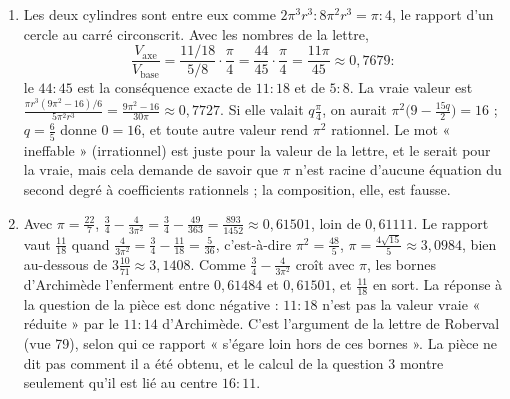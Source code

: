 \documentclass[11pt,a4paper]{article}
\begin{document}
\begin{solution}
\begin{enumerate}
  Le solide autour de l'axe est celui qu'engendre la demi-cycloïde, d'aire
  $\frac32\pi r^2$ ; la règle donne $V = 2\pi\delta\cdot\frac32\pi r^2 =
  3\pi^2r^2\delta$, et
  \[
  \frac{V}{2\pi^3r^3} = \frac{3\delta}{2\pi r} = \frac{3}{2}\cdot\frac{11}{27} = \frac{11}{18}
  \]
  pour $\delta = \frac{11}{27}\pi r$. Les deux énoncés faux de la lettre sont donc une seule donnée lue dans les deux
  sens ; la lettre de Roberval à Torricelli le dit à sa manière, qui écrit que ce
  rapport a été « déduit du centre trouvé auparavant » (vue 79). Le vrai $\delta$
  est $\frac{V}{3\pi^2r^2} = \frac{9\pi^2 - 16}{18\pi}\,r = \Bigl(\frac{\pi}{2} -
  \frac{8}{9\pi}\Bigr)r \approx 1{,}2879\,r$, contre $\frac{11}{27}\pi r \approx
  1{,}2799\,r$. Les vrais rapports sont, pour la base de la demi-cycloïde,
  $(\pi r - \delta) : \delta = (9\pi^2 + 16) : (9\pi^2 - 16) \approx 1{,}4394$, et non
  $\frac{16}{11} \approx 1{,}4545$ ; pour la base entière,
  $(\pi r + \delta) : (\pi r - \delta) = (27\pi^2 - 16) : (9\pi^2 + 16) \approx
  2{,}3895$, et non $\frac{19}{8} = 2{,}375$. Le soupçon que rapporte la pièce des
  vues 16--19 est fondé pour la demi-cycloïde ; pour la cycloïde entière, $7 : 5$
  est exact.
\item Les deux cylindres sont entre eux comme $2\pi^3r^3 : 8\pi^2r^3 = \pi : 4$,
  le rapport d'un cercle au carré circonscrit. Avec les nombres de la lettre,
  \[
  \frac{V_{\text{axe}}}{V_{\text{base}}} = \frac{11/18}{5/8}\cdot\frac{\pi}{4}
  = \frac{44}{45}\cdot\frac{\pi}{4} = \frac{11\pi}{45} \approx 0{,}7679 :
  \]
  le $44 : 45$ est la conséquence exacte de $11 : 18$ et de $5 : 8$. La vraie valeur
  est $\frac{\pi r^3(9\pi^2 - 16)/6}{5\pi^2r^3} = \frac{9\pi^2 - 16}{30\pi} \approx
  0{,}7727$. Si elle valait $q\frac{\pi}{4}$, on aurait
  $\pi^2\bigl(9 - \frac{15q}{2}\bigr) = 16$ ; $q = \frac65$ donne $0 = 16$, et toute
  autre valeur rend $\pi^2$ rationnel. Le mot « ineffable » (irrationnel) est juste
  pour la valeur de la lettre, et le serait pour la vraie, mais cela demande de
  savoir que $\pi$ n'est racine d'aucune équation du second degré à coefficients
  rationnels ; la composition, elle, est fausse.
\item Avec $\pi = \frac{22}{7}$, $\frac34 - \frac{4}{3\pi^2} = \frac34 -
  \frac{49}{363} = \frac{893}{1452} \approx 0{,}61501$, loin de $0{,}61111$. Le
  rapport vaut $\frac{11}{18}$ quand $\frac{4}{3\pi^2} = \frac34 - \frac{11}{18} =
  \frac{5}{36}$, c'est-à-dire $\pi^2 = \frac{48}{5}$, $\pi = \frac{4\sqrt{15}}{5}
  \approx 3{,}0984$, bien au-dessous de $3\frac{10}{71} \approx 3{,}1408$. Comme
  $\frac34 - \frac{4}{3\pi^2}$ croît avec $\pi$, les bornes d'Archimède
  l'enferment entre $0{,}61484$ et $0{,}61501$, et $\frac{11}{18}$ en sort. La
  réponse à la question de la pièce est donc négative : $11 : 18$ n'est pas la
  valeur vraie « réduite » par le $11 : 14$ d'Archimède. C'est l'argument de la
  lettre de Roberval (vue 79), selon qui ce rapport « s'égare loin hors de ces
  bornes ». La pièce ne dit pas comment il a été obtenu, et le calcul de la
  question 3 montre seulement qu'il est lié au centre $16 : 11$.
\end{enumerate}


\end{solution}
\end{document}
